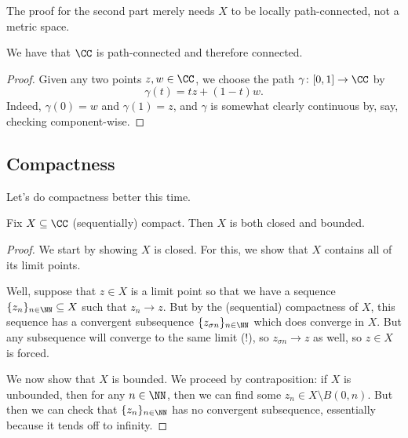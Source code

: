 \begin{remark}
	The proof for the second part merely needs $X$ to be locally path-connected, not a metric space.
\end{remark}
\begin{corollary} \label{cor:cconnected}
	We have that $\CC$ is path-connected and therefore connected.
\end{corollary}
\begin{proof}
	Given any two points $z,w\in\CC$, we choose the path $\gamma\colon [0,1]\to\CC$ by
	\[\gamma(t)=tz+(1-t)w.\]
	Indeed, $\gamma(0)=w$ and $\gamma(1)=z$, and $\gamma$ is somewhat clearly continuous by, say, checking component-wise.
\end{proof}

\subsection{Compactness}
Let's do compactness better this time.
\begin{lemma}
	Fix $X\subseteq\CC$ (sequentially) compact. Then $X$ is both closed and bounded.
\end{lemma}
\begin{proof}
	We start by showing $X$ is closed. For this, we show that $X$ contains all of its limit points.
	
	Well, suppose that $z\in X$ is a limit point so that we have a sequence $\{z_n\}_{n\in\NN}\subseteq X$ such that $z_n\to z$. But by the (sequential) compactness of $X$, this sequence has a convergent subsequence $\{z_{\sigma n}\}_{n\in\NN}$ which does converge in $X$. But any subsequence will converge to the same limit (!), so $z_{\sigma n}\to z$ as well, so $z\in X$ is forced.

	We now show that $X$ is bounded. We proceed by contraposition: if $X$ is unbounded, then for any $n\in\NN$, then we can find some $z_n\in X\setminus B(0,n)$. But then we can check that $\{z_n\}_{n\in\NN}$ has no convergent subsequence, essentially because it tends off to infinity.
\end{proof}

